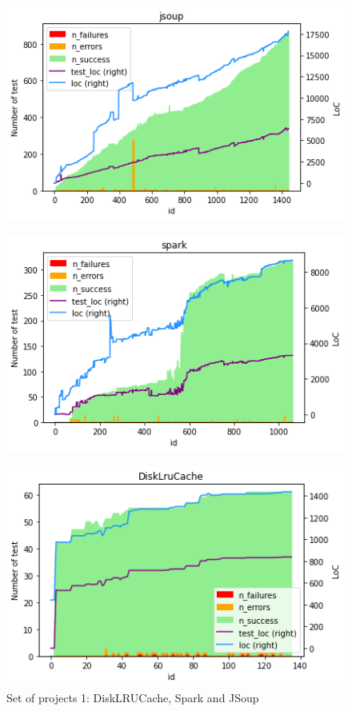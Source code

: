 \begin{figure}[!htb]
    \caption{Set of projects 1: DiskLRUCache, Spark and JSoup}
    \label{fig:projects-1}
    \begin{minipage}{.5\linewidth}
        \centering
        \includegraphics[width=\textwidth]{pages/02-Testability/images/projects/jsoup.png}
        \label{fig:jsoup}
    \end{minipage}%
    \begin{minipage}{.5\linewidth}
        \centering
        \includegraphics[width=\textwidth]{pages/02-Testability/images/projects/spark.png}
        \label{fig:spark}
    \end{minipage}
    \begin{minipage}{.5\linewidth}
        \centering
        \includegraphics[width=\textwidth]{pages/02-Testability/images/projects/disklrucache.png}

\end{minipage}
\end{figure}
